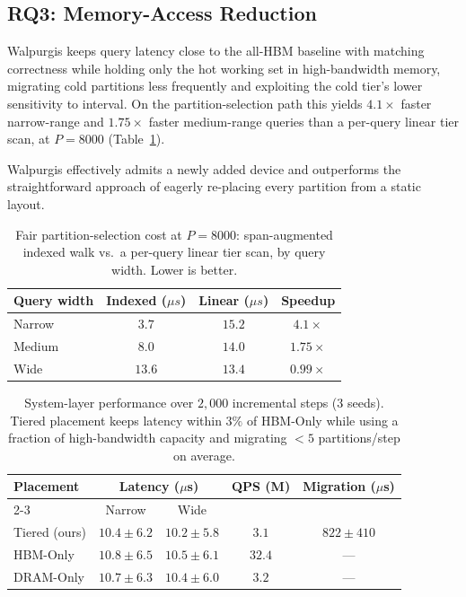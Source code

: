 \documentclass{article}
\begin{document}
\subsection{RQ3: Memory-Access Reduction}
\label{sec:rq3}

Walpurgis keeps query latency close to the all-HBM baseline with matching correctness
while holding only the hot working set in high-bandwidth memory, migrating cold
partitions less frequently and exploiting the cold tier's lower sensitivity to interval.
On the partition-selection path this yields $4.1\times$ faster narrow-range and
$1.75\times$ faster medium-range queries than a per-query linear tier scan, at
$P = 8000$ (Table~\ref{tab:selection}).

Walpurgis effectively admits a newly added device and outperforms the straightforward
approach of eagerly re-placing every partition from a static layout.

\begin{table}[t]
\centering
\caption{Fair partition-selection cost at $P=8000$: span-augmented indexed walk vs.\ a
per-query linear tier scan, by query width. Lower is better.}
\label{tab:selection}
\begin{tabular}{lccc}
\toprule
Query width & Indexed ($\mu s$) & Linear ($\mu s$) & Speedup \\
\midrule
Narrow & $3.7$ & $15.2$ & $4.1\times$ \\
Medium & $8.0$ & $14.0$ & $1.75\times$ \\
Wide   & $13.6$ & $13.4$ & $0.99\times$ \\
\bottomrule
\end{tabular}
\end{table}

\begin{table}[t]
\centering
\caption{System-layer performance over $2{,}000$ incremental steps ($3$ seeds).
Tiered placement keeps latency within $3\%$ of HBM-Only while using a fraction of
high-bandwidth capacity and migrating $<5$ partitions/step on average.}
\label{tab:system_bench}
\begin{tabular}{lcccc}
\toprule
Placement & \multicolumn{2}{c}{Latency ($\mu$s)} & QPS (M) & Migration ($\mu$s) \\
\cmidrule(lr){2-3}
          & Narrow & Wide & & \\
\midrule
Tiered (ours) & $10.4{\pm}6.2$ & $10.2{\pm}5.8$ & $3.1$ & $822{\pm}410$ \\
HBM-Only      & $10.8{\pm}6.5$ & $10.5{\pm}6.1$ & $32.4$ & --- \\
DRAM-Only     & $10.7{\pm}6.3$ & $10.4{\pm}6.0$ & $3.2$ & --- \\
\bottomrule
\end{tabular}
\end{table}
\end{document}
